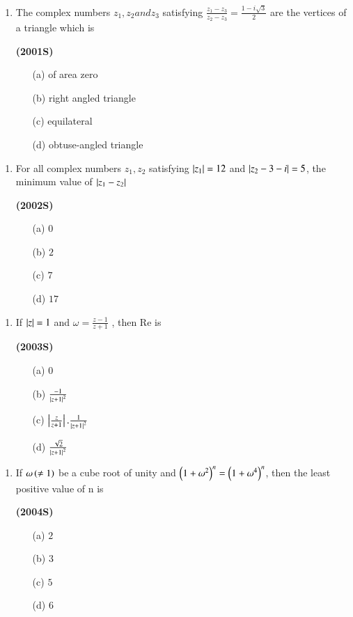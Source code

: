 \documentclass[journal,12pt,twocolumn]{IEEEtran}
\theoremstyle{remark}
\begin{document}
\begin{enumerate}[start=17]
\item The complex numbers $z_1,z_2 and z_3$ satisfying $\frac{z_1-z_3}{z_2-z_3}=\frac{1-i\sqrt{3}}{2}$ are the vertices of a triangle which is

\hfill{\textbf{(2001S)}}

\begin{enumerate}
\item[(a)]of area zero
\item[(b)]right angled triangle
\item[(c)]equilateral
\item[(d)]obtuse-angled triangle
\end{enumerate}
\end{enumerate}
\begin{enumerate}[start=18]
\item For all complex numbers $z_1,z_2$ satisfying $\left\vert z_1\right\vert=12$ and $\left\vert z_2-3-i\right\vert=5$, the minimum value of $\left\vert z_1-z_2\right\vert$

\hfill{\textbf{(2002S)}}

\begin{enumerate}
\item[(a)]$0$
\item[(b)]$2$
\item[(c)]$7$
\item[(d)]$17$
\end{enumerate}
\end{enumerate}
\begin{enumerate}[start=19]
\item If $\left\vert z\right\vert=1$ and $\omega=\frac{z-1}{z+1}$ , then Re\brak{\omega} is

\hfill{\textbf{(2003S)}}

\begin{enumerate}
\item[(a)]$0$
\item[(b)]$\frac{-1}{\left\vert z+1\right\vert^2}$
\item[(c)]$\left\vert\frac{z}{z+1}\right\vert.\frac{1}{\left\vert z+1\right\vert^2}$
\item[(d)]$\frac{\sqrt{2}}{\left\vert z+1\right\vert^2}$
\end{enumerate}
\end{enumerate}
\begin{enumerate}[start=20]
\item If $\omega\left(\neq1\right)$ be a cube root of unity and $\left(1+\omega^2\right)^n = \left(1+\omega^4\right)^n$, then the least positive value of n is

\hfill{\textbf{(2004S)}}

\begin{enumerate}
\item[(a)]$2$
\item[(b)]$3$
\item[(c)]$5$
\item[(d)]$6$
\end{enumerate}
\end{enumerate}
\end{document}

